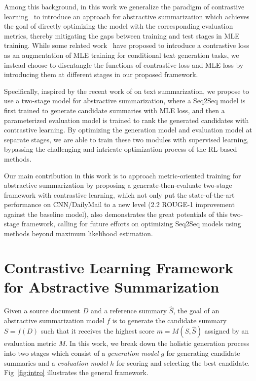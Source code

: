 \documentclass[11pt,a4paper]{article}
\begin{document}
Among this background, in this work we generalize the paradigm of contrastive learning~\citep{chopra2005learning} to introduce an approach for abstractive summarization which achieves the goal of directly optimizing the model with the corresponding evaluation metrics, thereby mitigating the gaps between training and test stages in MLE training.
While some related work~\citep{lee2021contrastive, pan2021contrastive} have proposed to introduce a contrastive loss as an augmentation of MLE training for conditional text generation tasks, we instead choose to disentangle the functions of contrastive loss and MLE loss by introducing them at different stages in our proposed framework.

Specifically, inspired by the recent work of \citet{zhong-etal-2020-extractive, liu-etal-2021-refsum} on text summarization, we propose to use a two-stage model for abstractive summarization, where a Seq2Seq model is first trained to generate candidate summaries with MLE loss, and then a parameterized evaluation model is trained to rank the generated candidates with contrastive learning.
By optimizing the generation model and evaluation model at separate stages, we are able to train these two modules with supervised learning, bypassing the challenging and intricate optimization process of the RL-based methods.

Our main contribution in this work is to approach metric-oriented training for abstractive summarization by proposing a generate-then-evaluate two-stage framework with contrastive learning, which not only put the state-of-the-art performance on CNN/DailyMail to a new level (2.2 ROUGE-1 improvement against the baseline model), also demonstrates the great potentials of this two-stage framework, calling for future efforts on optimizing Seq2Seq models using methods beyond maximum likelihood estimation.

\section{Contrastive Learning Framework for Abstractive Summarization}

Given a source document $D$ and a reference summary $\hat{S}$, the goal of an abstractive summarization model $f$ is to generate the candidate summary $S = f(D)$ such that it receives the highest score $m = M(S, \hat{S}) $ assigned by an evaluation metric $M$.
In this work, we break down the holistic generation process into two stages which consist of a \textit{generation model} $g$ for generating candidate summaries and a \textit{evaluation model} $h$ for scoring and selecting the best candidate. 
Fig~\ref{fig:intro} illustrates the general framework.
\end{document}
